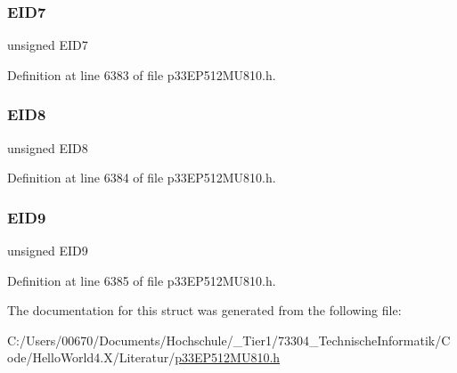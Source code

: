 \subsubsection{\texorpdfstring{E\+I\+D7}{EID7}}
{\footnotesize\ttfamily unsigned E\+I\+D7}



Definition at line 6383 of file p33\+E\+P512\+M\+U810.\+h.

\mbox{\label{structtag_c2_r_x_f3_e_i_d_b_i_t_s_acca25e0b7d86eb499d01f85222baea87}} 
\subsubsection{\texorpdfstring{E\+I\+D8}{EID8}}
{\footnotesize\ttfamily unsigned E\+I\+D8}



Definition at line 6384 of file p33\+E\+P512\+M\+U810.\+h.

\mbox{\label{structtag_c2_r_x_f3_e_i_d_b_i_t_s_ac6748f73d4ada8538b06548be4f396c2}} 
\subsubsection{\texorpdfstring{E\+I\+D9}{EID9}}
{\footnotesize\ttfamily unsigned E\+I\+D9}



Definition at line 6385 of file p33\+E\+P512\+M\+U810.\+h.



The documentation for this struct was generated from the following file\+:\begin{DoxyCompactItemize}
\item 
C\+:/\+Users/00670/\+Documents/\+Hochschule/\+\_\+\+Tier1/73304\+\_\+\+Technische\+Informatik/\+Code/\+Hello\+World4.\+X/\+Literatur/\hyperlink{p33_e_p512_m_u810_8h}{p33\+E\+P512\+M\+U810.\+h}\end{DoxyCompactItemize}
